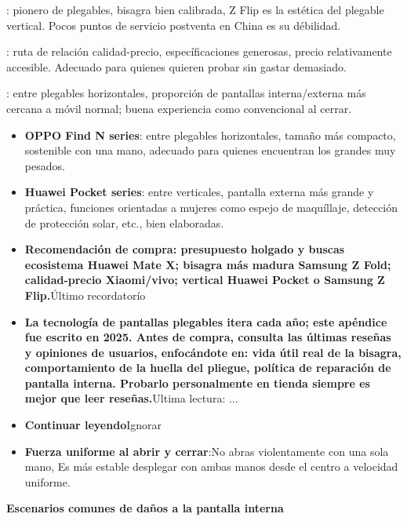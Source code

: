 
: pionero de plegables, bisagra bien calibrada, Z Flip es la estética del plegable vertical. Pocos puntos de servicio postventa en China es su débilidad.


: ruta de relación calidad-precio, específicaciones generosas, precio relativamente accesible. Adecuado para quienes quieren probar sin gastar demasiado.


: entre plegables horizontales, proporción de pantallas interna/externa más cercana a móvil normal; buena experiencia como convencional al cerrar.

\begin{itemize}
  \item \textbf{OPPO Find N series}: entre plegables horizontales, tamaño más compacto, sostenible con una mano, adecuado para quienes encuentran los grandes muy pesados.
  \item \textbf{Huawei Pocket series}: entre verticales, pantalla externa más grande y práctica, funciones orientadas a mujeres como espejo de maquíllaje, detección de protección solar, etc., bien elaboradas.
  \item \textbf{Recomendación de compra: presupuesto holgado y buscas ecosistema Huawei Mate X; bisagra más madura Samsung Z Fold; calidad-precio Xiaomi/vivo; vertical Huawei Pocket o Samsung Z Flip.}Último recordatorío
  \item \textbf{La tecnología de pantallas plegables itera cada año; este apéndice fue escrito en 2025. Antes de compra, consulta las últimas reseñas y opiniones de usuarios, enfocándote en: vida útil real de la bisagra, comportamiento de la huella del pliegue, política de reparación de pantalla interna. Probarlo personalmente en tienda siempre es mejor que leer reseñas.}Ultima lectura: ...
  \item \textbf{Continuar leyendo}Ignorar
  \item \textbf{Fuerza uniforme al abrir y cerrar}:No abras violentamente con una sola mano, Es más estable desplegar con ambas manos desde el centro a velocidad uniforme.
\end{itemize}

\textbf{Escenarios comunes de daños a la pantalla interna}\par

